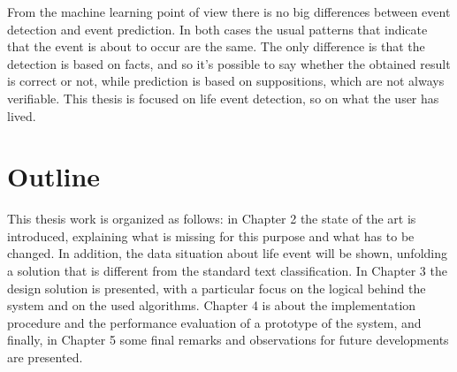 From the machine learning point of view there is no big differences between event detection and event prediction. In both cases the usual patterns that indicate that the event is about to occur are the same. The only difference is that the detection is based on facts, and so it's possible to say whether the obtained result is correct or not, while prediction is based on suppositions, which are not always verifiable. This thesis is focused on life event detection, so on what the user has lived.

\section{Outline}

This thesis work is organized as follows: in Chapter 2 the state of the art is introduced, explaining what is missing for this purpose and what has to be changed. In addition, the data situation about life event will be shown, unfolding a solution that is different from the standard text classification. In Chapter 3 the design solution is presented, with a particular focus on the logical behind the system and on the used algorithms. Chapter 4 is about the implementation procedure and the performance evaluation of a prototype of the system, and finally, in Chapter 5 some final remarks and observations for future developments are presented.

